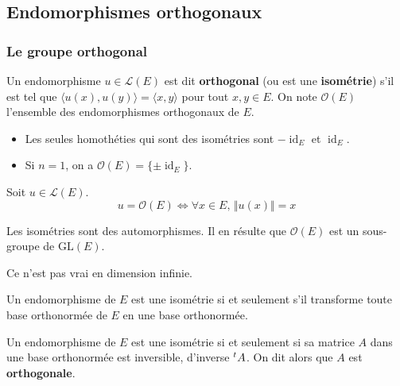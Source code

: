 	\subsection{Endomorphismes orthogonaux}
	
	\label{158-4}
	
	\subsubsection{Le groupe orthogonal}
	
	
	\begin{definition}
		Un endomorphisme $u \in \mathcal{L}(E)$ est dit \textbf{orthogonal} (ou est une \textbf{isométrie}) s'il est tel que $\langle u(x), u(y) \rangle = \langle x, y \rangle$ pour tout $x, y \in E$. On note $\mathcal{O}(E)$ l'ensemble des endomorphismes orthogonaux de $E$.
	\end{definition}
	
	\begin{example}
		\begin{itemize}
			\item Les seules homothéties qui sont des isométries sont $-\operatorname{id}_E$ et $\operatorname{id}_E$.
			\item Si $n = 1$, on a $\mathcal{O}(E) = \{ \pm \operatorname{id}_E \}$.
		\end{itemize}
	\end{example}
	
	\begin{proposition}
		Soit $u \in \mathcal{L}(E)$.
		\[ u = \mathcal{O}(E) \iff \forall x \in E, \, \Vert u(x) \Vert = x \]
	\end{proposition}
	
	\begin{theorem}
		Les isométries sont des automorphismes. Il en résulte que $\mathcal{O}(E)$ est un sous-groupe de $\mathrm{GL}(E)$.
	\end{theorem}
	
	\begin{remark}
		Ce n'est pas vrai en dimension infinie.
	\end{remark}
	
	\begin{theorem}
		Un endomorphisme de $E$ est une isométrie si et seulement s'il transforme toute base orthonormée de $E$ en une base orthonormée.
	\end{theorem}
	
	\begin{theorem}
		Un endomorphisme de $E$ est une isométrie si et seulement si sa matrice $A$ dans une base orthonormée est inversible, d'inverse $\mathstrut ^t A$.
		\newpar
		On dit alors que $A$ est \textbf{orthogonale}.
	\end{theorem}
	
